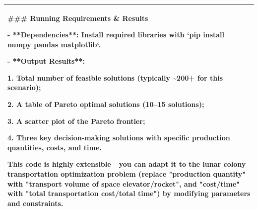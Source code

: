 \begin{longtable}[]{@{}
  >{\raggedright\arraybackslash}p{}@{}}
\#\#\# Running Requirements \& Results

- **Dependencies**: Install required libraries with `pip install numpy
pandas matplotlib`.

- **Output Results**:

1. Total number of feasible solutions (typically \textasciitilde200+ for
this scenario);

2. A table of Pareto optimal solutions (10--15 solutions);

3. A scatter plot of the Pareto frontier;

4. Three key decision-making solutions with specific production
quantities, costs, and time.

This code is highly extensible---you can adapt it to the lunar colony
transportation optimization problem (replace "production quantity" with
"transport volume of space elevator/rocket", and "cost/time" with "total
transportation cost/total time") by modifying parameters and
constraints. \\
\bottomrule
\end{longtable}
